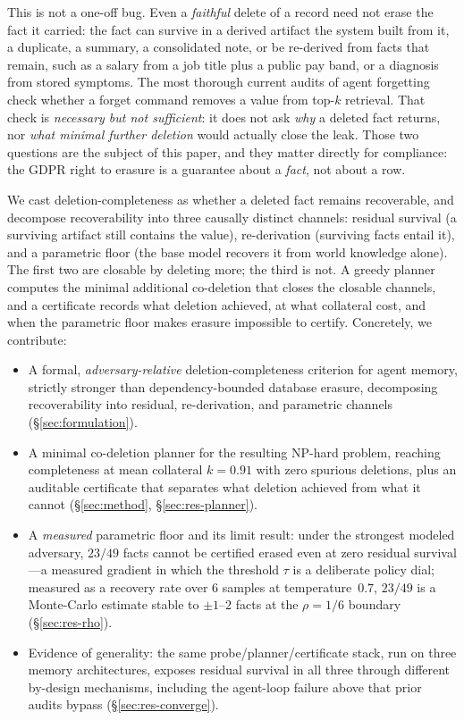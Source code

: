 \documentclass[10pt,twocolumn,letterpaper]{article}
\theoremstyle{definition}
\theoremstyle{plain}
\begin{document}
This is not a one-off bug. Even a \emph{faithful} delete of a record need not
erase the fact it carried: the fact can survive in a derived artifact the system
built from it, a duplicate, a summary, a consolidated note, or be re-derived
from facts that remain, such as a salary from a job title plus a public pay band,
or a diagnosis from stored symptoms. The most thorough current audits of agent
forgetting \citep{forgeteval} check whether a forget command removes a value from
top-$k$ retrieval. That check is \emph{necessary but not sufficient}: it does not
ask \emph{why} a deleted fact returns, nor \emph{what minimal further deletion}
would actually close the leak. Those two questions are the subject of this paper,
and they matter directly for compliance: the GDPR right to erasure
\citep{gdpr2016} is a guarantee about a \emph{fact}, not about a row.

We cast deletion-completeness as whether a deleted fact remains recoverable, and
decompose recoverability into three causally distinct channels: residual survival
(a surviving artifact still contains the value), re-derivation (surviving facts
entail it), and a parametric floor (the base model recovers it from world
knowledge alone). The first two are closable by deleting more; the third is not.
A greedy planner computes the minimal additional co-deletion that closes the
closable channels, and a certificate records what deletion achieved, at what
collateral cost, and when the parametric floor makes erasure
impossible to certify. Concretely, we contribute:

\begin{itemize}\itemsep2pt
  \item A formal, \emph{adversary-relative} deletion-completeness criterion for
    agent memory, strictly stronger than dependency-bounded database erasure,
    decomposing recoverability into residual, re-derivation, and parametric
    channels (\S\ref{sec:formulation}).

  \item A minimal co-deletion planner for the resulting NP-hard problem, reaching
    completeness at mean collateral $k=0.91$ with zero spurious deletions, plus an
    auditable certificate that separates what deletion achieved from what it
    cannot (\S\ref{sec:method}, \S\ref{sec:res-planner}).

  \item A \emph{measured} parametric floor and its limit result: under the
    strongest modeled adversary, $23/49$ facts cannot be certified erased even at
    zero residual survival---a measured gradient in which the threshold $\tau$ is a
    deliberate policy dial; measured as a recovery rate over $6$ samples at
temperature~$0.7$, $23/49$ is a Monte-Carlo estimate stable to $\pm1$--$2$ facts at
the $\rho{=}1/6$ boundary (\S\ref{sec:res-rho}).

  \item Evidence of generality: the same probe/planner/certificate stack, run on
    three memory architectures, exposes residual survival in all three through
    different by-design mechanisms, including the agent-loop failure above that
    prior audits bypass (\S\ref{sec:res-converge}).
\end{itemize}
\end{document}
